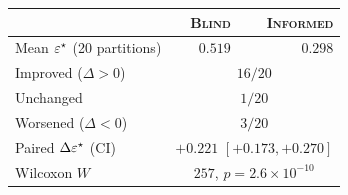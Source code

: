\begin{tabular}{@{}lrr@{}}
\toprule
                                 & \textsc{Blind}  & \textsc{Informed} \\
\midrule
Mean $\varepsilon^\star$ (20 partitions)& $0.519$         & $0.298$           \\
Improved ($\Delta>0$)            & \multicolumn{2}{c}{$16/20$}         \\
Unchanged                        & \multicolumn{2}{c}{$1/20$}          \\
Worsened ($\Delta<0$)            & \multicolumn{2}{c}{$3/20$}          \\
\midrule
Paired $\Delta\varepsilon^\star$ (CI)   & \multicolumn{2}{c}{$+0.221$ $[+0.173,+0.270]$} \\
Wilcoxon $W$                     & \multicolumn{2}{c}{$257$, $p\!=\!2.6\!\times\!10^{-10}$} \\
\bottomrule
\end{tabular}
